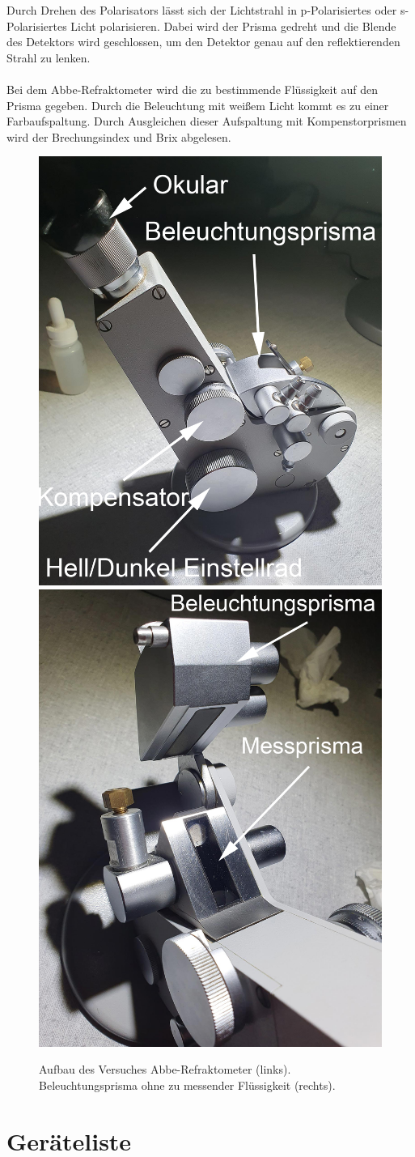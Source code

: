 \documentclass[12pt,a4paper,twoside]{article}
\begin{document}
\noindent
Durch Drehen des Polarisators lässt sich der Lichtstrahl in p-Polarisiertes oder s-Polarisiertes Licht polarisieren. 
Dabei wird der Prisma gedreht und die Blende des Detektors wird geschlossen, um den Detektor genau auf den reflektierenden Strahl zu lenken. 
\\
\\
Bei dem Abbe-Refraktometer wird die zu bestimmende Flüssigkeit auf den Prisma gegeben. Durch die Beleuchtung mit weißem Licht kommt es zu einer Farbaufspaltung. 
Durch Ausgleichen dieser Aufspaltung mit Kompenstorprismen wird der Brechungsindex und Brix abgelesen. 

\begin{figure}[H]
    \centering
    \includegraphics[width=0.4\linewidth]{nudes/abbe.jpg}
    \includegraphics[width=0.4\linewidth]{nudes/abbe2.jpg}
    \caption{Aufbau des Versuches Abbe-Refraktometer (links). Beleuchtungsprisma ohne zu messender Flüssigkeit (rechts). }
    \label{fig:abbe}
\end{figure}



\section{Geräteliste} %
\end{document}
